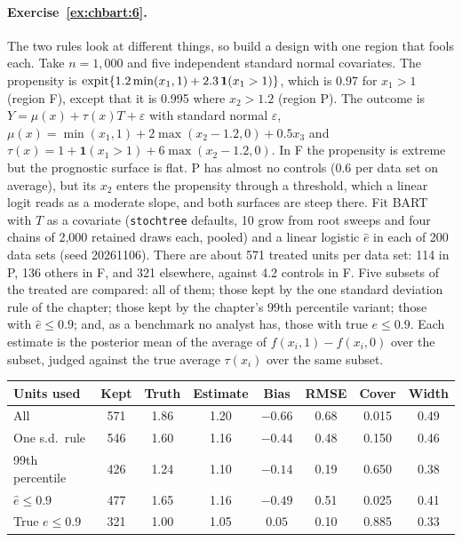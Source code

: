 \paragraph{Exercise~\ref{ex:chbart:6}.} The two rules look at different things, so build a design with one region that fools each. Take $n = 1{,}000$ and five independent standard normal covariates. The propensity is $\operatorname{expit}\{1.2\min(x_1, 1) + 2.3\,\mathbf{1}(x_1 > 1)\}$, which is 0.97 for $x_1 > 1$ (region F), except that it is 0.995 where $x_2 > 1.2$ (region P). The outcome is $Y = \mu(x) + \tau(x)T + \varepsilon$ with standard normal $\varepsilon$, $\mu(x) = \min(x_1, 1) + 2\max(x_2 - 1.2, 0) + 0.5x_3$ and $\tau(x) = 1 + \mathbf{1}(x_1 > 1) + 6\max(x_2 - 1.2, 0)$. In F the propensity is extreme but the prognostic surface is flat. P has almost no controls (0.6 per data set on average), but its $x_2$ enters the propensity through a threshold, which a linear logit reads as a moderate slope, and both surfaces are steep there. Fit BART with $T$ as a covariate (\texttt{stochtree} defaults, 10 grow from root sweeps and four chains of 2,000 retained draws each, pooled) and a linear logistic $\hat e$ in each of 200 data sets (seed 20261106). There are about 571 treated units per data set: 114 in P, 136 others in F, and 321 elsewhere, against 4.2 controls in F. Five subsets of the treated are compared: all of them; those kept by the one standard deviation rule of the chapter; those kept by the chapter's 99th percentile variant; those with $\hat e \leq 0.9$; and, as a benchmark no analyst has, those with true $e \leq 0.9$. Each estimate is the posterior mean of the average of $f(x_i, 1) - f(x_i, 0)$ over the subset, judged against the true average $\tau(x_i)$ over the same subset.
\begin{center}
\small
\begin{tabular}{lccccccc}
\toprule
Units used & Kept & Truth & Estimate & Bias & RMSE & Cover & Width \\
\midrule
All & 571 & 1.86 & 1.20 & $-0.66$ & 0.68 & 0.015 & 0.49 \\
One s.d.\ rule & 546 & 1.60 & 1.16 & $-0.44$ & 0.48 & 0.150 & 0.46 \\
99th percentile & 426 & 1.24 & 1.10 & $-0.14$ & 0.19 & 0.650 & 0.38 \\
$\hat e \leq 0.9$ & 477 & 1.65 & 1.16 & $-0.49$ & 0.51 & 0.025 & 0.41 \\
True $e \leq 0.9$ & 321 & 1.00 & 1.05 & $0.05$ & 0.10 & 0.885 & 0.33 \\
\bottomrule
\end{tabular}
\end{center}
